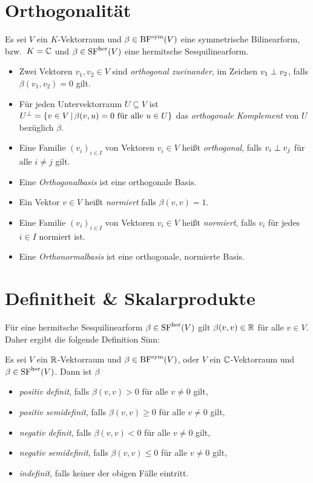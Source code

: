 \section{Orthogonalität}

Es sei $V$ ein $K$-Vektorraum und $\beta \in \operatorname{BF}^{\operatorname{sym}}(V)$ eine symmetrische Bilinearform, bzw.\ $K = \mathbb{C}$ und $\beta \in \operatorname{SF}^{\operatorname{her}}(V)$ eine hermitsche Sesquilinearform.

\begin{definition}
  \begin{itemize}
    \item
      Zwei Vektoren $v_1, v_2 \in V$ sind \emph{orthogonal zueinander}, im Zeichen $v_1 \mathrel{\perp} v_2$, falls $\beta(v_1, v_2) = 0$ gilt.
    \item
      Für jeden Untervektorraum $U \subseteq V$ ist $U^\perp = \{v \in V \,|\, \text{$\beta(v,u) = 0$ für alle $u \in U$}\}$ das \emph{orthogonale Komplement} von $U$ bezüglich $\beta$.
    \item
      Eine Familie $(v_i)_{i \in I}$ von Vektoren $v_i \in V$ heißt \emph{orthogonal}, falls $v_i \mathrel{\perp} v_j$ für alle $i \neq j$ gilt.
    \item
      Eine \emph{Orthogonalbasis} ist eine orthogonale Basis.
    \item
      Ein Vektor $v \in V$ heißt \emph{normiert} falls $\beta(v,v) = 1$.
    \item
      Eine Familie $(v_i)_{i \in I}$ von Vektoren $v_i \in V$ heißt \emph{normiert}, falls $v_i$ für jedes $i \in I$ normiert ist.
    \item
      Eine \emph{Orthonormalbasis} ist eine orthogonale, normierte Basis.
  \end{itemize}
\end{definition}




\section{Definitheit \& Skalarprodukte}

Für eine hermitsche Sesquilinearform $\beta \in \operatorname{SF}^{\operatorname{her}}(V)$ gilt $\beta(v,v) \in \mathbb{R}$ für alle $v \in V$.
Daher ergibt die folgende Definition Sinn:

\begin{definition}
  Es sei $V$ ein $\mathbb{R}$-Vektorraum und $\beta \in \operatorname{BF}^{\operatorname{sym}}(V)$, oder $V$ ein $\mathbb{C}$-Vektorraum und $\beta \in \operatorname{SF}^{\operatorname{her}}(V)$.
  Dann ist $\beta$
  \begin{itemize}
    \item
      \emph{positiv definit}, falls $\beta(v,v) > 0$ für alle $v \neq 0$ gilt,
    \item
      \emph{positiv semidefinit}, falls $\beta(v,v) \geq 0$ für alle $v \neq 0$ gilt,
    \item
      \emph{negativ definit}, falls $\beta(v,v) < 0$ für alle $v \neq 0$ gilt,
    \item
      \emph{negativ semidefinit}, falls $\beta(v,v) \leq 0$ für alle $v \neq 0$ gilt,
    \item
      \emph{indefinit}, falls keiner der obigen Fälle eintritt.
  \end{itemize}
\end{definition}

